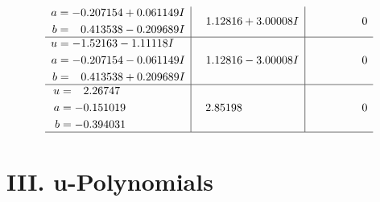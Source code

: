 \documentclass[1p]{elsarticle_modified}
\theoremstyle{definition}
\begin{document}
$$\begin{array}{c|c|c}
\begin{aligned}
a &= -0.207154 + 0.061149 I \\
b &= \phantom{-}0.413538 - 0.209689 I\end{aligned}
 & \phantom{-}1.12816 + 3.00008 I & \phantom{-0.000000 } 0 \\ \hline\begin{aligned}
u &= -1.52163 - 1.11118 I \\
a &= -0.207154 - 0.061149 I \\
b &= \phantom{-}0.413538 + 0.209689 I\end{aligned}
 & \phantom{-}1.12816 - 3.00008 I & \phantom{-0.000000 } 0 \\ \hline\begin{aligned}
u &= \phantom{-}2.26747\phantom{ +0.000000I} \\
a &= -0.151019\phantom{ +0.000000I} \\
b &= -0.394031\phantom{ +0.000000I}\end{aligned}
 & \phantom{-}2.85198\phantom{ +0.000000I} & \phantom{-0.000000 } 0\\
 \hline 
 \end{array}$$\newpage
\newpage\renewcommand{\arraystretch}{1}
\centering \section*{ III. u-Polynomials}
\end{document}

